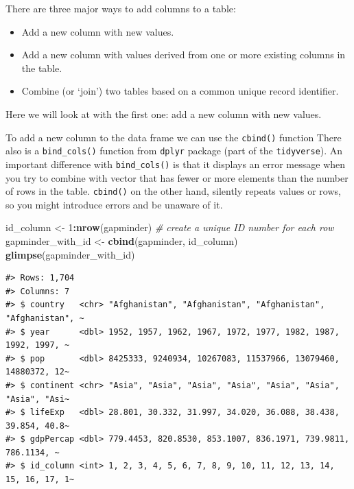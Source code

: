\documentclass[
]{book}
\newenvironment{Shaded}{\begin{snugshade}}{\end{snugshade}}
\newcommand{\CommentTok}[1]{\textcolor[rgb]{0.56,0.35,0.01}{\textit{#1}}}
\newcommand{\DecValTok}[1]{\textcolor[rgb]{0.00,0.00,0.81}{#1}}
\newcommand{\FunctionTok}[1]{\textcolor[rgb]{0.13,0.29,0.53}{\textbf{#1}}}
\newcommand{\NormalTok}[1]{#1}
\newcommand{\OtherTok}[1]{\textcolor[rgb]{0.56,0.35,0.01}{#1}}
\newcommand{\SpecialCharTok}[1]{\textcolor[rgb]{0.81,0.36,0.00}{\textbf{#1}}}
\providecommand{\tightlist}{%
  \setlength{\itemsep}{0pt}\setlength{\parskip}{0pt}}
\begin{document}
There are three major ways to add columns to a table:

\begin{itemize}
\tightlist
\item
  Add a new column with new values.
\item
  Add a new column with values derived from one or more existing columns in the table.
\item
  Combine (or `join') two tables based on a common unique record identifier.
\end{itemize}

Here we will look at with the first one: add a new column with new values.

To add a new column to the data frame we can use the \texttt{cbind()} function There also is a \texttt{bind\_cols()} function from \texttt{dplyr} package (part of the \texttt{tidyverse}). An important difference with \texttt{bind\_cols()} is that it displays an error message when you try to combine with vector that has fewer or more elements than the number of rows in the table. \texttt{cbind()} on the other hand, silently repeats values or rows, so you might introduce errors and be unaware of it.

\begin{Shaded}
\begin{Highlighting}[]
\NormalTok{id\_column }\OtherTok{\textless{}{-}} \DecValTok{1}\SpecialCharTok{:}\FunctionTok{nrow}\NormalTok{(gapminder) }\CommentTok{\# create a unique ID number for each row}
\NormalTok{gapminder\_with\_id }\OtherTok{\textless{}{-}} \FunctionTok{cbind}\NormalTok{(gapminder, id\_column) }
\FunctionTok{glimpse}\NormalTok{(gapminder\_with\_id)}
\end{Highlighting}
\end{Shaded}

\begin{verbatim}
#> Rows: 1,704
#> Columns: 7
#> $ country   <chr> "Afghanistan", "Afghanistan", "Afghanistan", "Afghanistan", ~
#> $ year      <dbl> 1952, 1957, 1962, 1967, 1972, 1977, 1982, 1987, 1992, 1997, ~
#> $ pop       <dbl> 8425333, 9240934, 10267083, 11537966, 13079460, 14880372, 12~
#> $ continent <chr> "Asia", "Asia", "Asia", "Asia", "Asia", "Asia", "Asia", "Asi~
#> $ lifeExp   <dbl> 28.801, 30.332, 31.997, 34.020, 36.088, 38.438, 39.854, 40.8~
#> $ gdpPercap <dbl> 779.4453, 820.8530, 853.1007, 836.1971, 739.9811, 786.1134, ~
#> $ id_column <int> 1, 2, 3, 4, 5, 6, 7, 8, 9, 10, 11, 12, 13, 14, 15, 16, 17, 1~
\end{verbatim}
\end{document}
